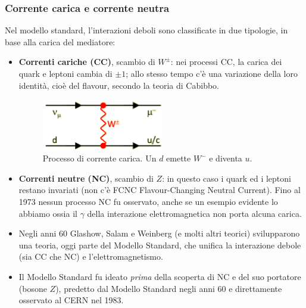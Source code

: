 \subsubsection{Corrente carica e corrente neutra}
Nel modello standard, l'interazioni deboli sono classificate in due tipologie, in base alla carica del mediatore:
\begin{itemize}
    \item \textbf{Correnti cariche (CC)}, scambio di $W^\pm$: nei processi CC, la carica dei quark e leptoni cambia di $\pm1$; allo stesso tempo c'è una variazione della loro identità, cioè del flavour, secondo la teoria di Cabibbo.
    \begin{figure}[H]
        \centering
        \includegraphics[width=0.5\textwidth]{immagini/fig_cc_process.png}
        \caption{Processo di corrente carica. Un $d$ emette $W^-$ e diventa $u$.}
    \end{figure}
    \item \textbf{Correnti neutre (NC)}, scambio di $Z$: in questo caso i quark ed i leptoni restano invariati (non c'è FCNC Flavour-Changing Neutral Current). Fino al 1973 nessun processo NC fu osservato, anche se un esempio evidente lo abbiamo ossia il $\gamma$ della interazione elettromagnetica non porta alcuna carica.
    \item Negli anni 60 Glashow, Salam e Weinberg (e molti altri teorici) svilupparono una teoria, oggi parte del Modello Standard, che unifica la interazione debole (sia CC che NC) e l'elettromagnetismo.
    \item Il Modello Standard fu ideato \textit{prima} della scoperta di NC e del suo portatore (bosone $Z$), predetto dal Modello Standard negli anni 60 e direttamente osservato al CERN nel 1983.
\end{itemize}
